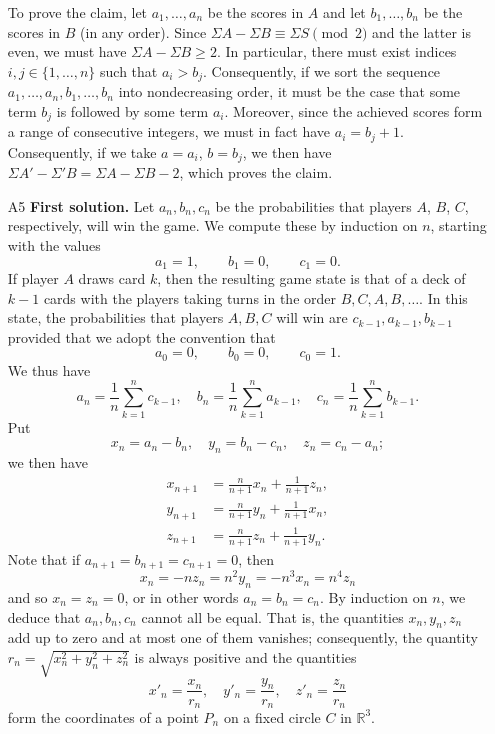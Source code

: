 \documentclass[amssymb,twocolumn,pra,10pt,aps]{revtex4-1}
\begin{document}
\begin{itemize}
To prove the claim, let 
$a_1,\dots,a_n$ be the scores in $A$ and let $b_1,\dots,b_n$ be the scores in $B$ (in any order).
Since $\Sigma A - \Sigma B \equiv \Sigma S \pmod{2}$ and the latter is even, we must have
$\Sigma A - \Sigma B \geq 2$.
In particular, there must exist indices $i,j \in \{1,\dots,n\}$ such that $a_i > b_j$.
Consequently, if we sort the sequence $a_1,\dots,a_n,b_1,\dots,b_n$ into nondecreasing order,
it must be the case that some term $b_j$ is followed by some term $a_i$.
Moreover, since the achieved scores form a range of consecutive integers, we must in fact have
$a_i = b_j + 1$. Consequently, if we take $a = a_i$, $b = b_j$, we then have
$\Sigma A' - \Sigma' B = \Sigma A - \Sigma B - 2$, which proves the claim.

\item[A5]
\textbf{First solution.}
Let $a_n, b_n, c_n$ be the probabilities that players $A$, $B$, $C$, respectively, will win the game.
We compute these by induction on $n$, starting with the values
\[
a_1 = 1, \qquad b_1 = 0, \qquad c_1 = 0.
\]
If player $A$ draws card $k$, then the resulting game state is that of a deck of $k-1$ cards with the players taking turns in the order $B,C,A,B,\dots$. In this state, the probabilities that players $A, B, C$ will win are
$c_{k-1}, a_{k-1}, b_{k-1}$ provided that we adopt the convention that
\[
a_0 = 0, \qquad b_0 = 0, \qquad c_0 = 1.
\]
We thus have
\[
a_n = \frac{1}{n} \sum_{k=1}^{n} c_{k-1}, \quad
b_n = \frac{1}{n} \sum_{k=1}^{n} a_{k-1}, \quad
c_n = \frac{1}{n} \sum_{k=1}^{n} b_{k-1}.
\]
Put
\[
x_n = a_n - b_n, \quad y_n = b_n - c_n, \quad z_n = c_n - a_n;
\]
we then have
\begin{align*}
 x_{n+1} &= \frac{n}{n+1} x_n + \frac{1}{n+1}z_n, \\
 y_{n+1} &= \frac{n}{n+1} y_n + \frac{1}{n+1}x_n, \\
 z_{n+1} &= \frac{n}{n+1} z_n + \frac{1}{n+1}y_n.
\end{align*}
Note that if $a_{n+1} = b_{n+1} = c_{n+1} = 0$, then
\[
x_n = -nz_n = n^2y_n = -n^3x_n = n^4z_n
\]
and so $x_n = z_n = 0$, or in other words $a_n = b_n = c_n$. By induction on $n$, we deduce that 
$a_n, b_n, c_n$ cannot all be equal. That is, the quantities $x_n, y_n, z_n$ add up to zero and at most one of them
vanishes; consequently, the quantity $r_n = \sqrt{x_n^2 + y_n^2 + z_n^2}$ is always positive
and the quantities
\[
x'_n = \frac{x_n}{r_n}, \quad y'_n = \frac{y_n}{r_n}, \quad z'_n = \frac{z_n}{r_n}
\]
form the coordinates of a point $P_n$ on a fixed circle $C$ in $\mathbb{R}^3$.


\end{itemize}
\end{document}
